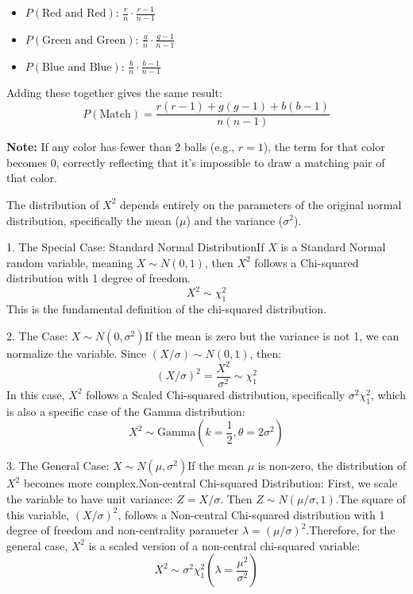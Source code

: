 \documentclass{report}
\begin{document}
\begin{sol}
    \begin{itemize}
        \item $P(\text{Red and Red})$: $\frac{r}{n} \cdot \frac{r-1}{n-1}$
        \item $P(\text{Green and Green})$: $\frac{g}{n} \cdot \frac{g-1}{n-1}$
        \item $P(\text{Blue and Blue})$: $\frac{b}{n} \cdot \frac{b-1}{n-1}$
    \end{itemize}

    Adding these together gives the same result:
    $$P(\text{Match}) = \frac{r(r-1) + g(g-1) + b(b-1)}{n(n-1)}$$

    \textbf{Note:} If any color has fewer than 2 balls (e.g., $r=1$), the term for that color becomes 0, correctly reflecting that it's impossible to draw a matching pair of that color.

\end{sol}


\begin{sol}
    
    The distribution of $X^2$ depends entirely on the parameters of the original normal distribution, specifically the mean ($\mu$) and the variance ($\sigma^2$).
    
    1. The Special Case: Standard Normal DistributionIf $X$ is a Standard Normal random variable, meaning $X \sim N(0, 1)$, then $X^2$ follows a Chi-squared distribution with 1 degree of freedom.$$X^2 \sim \chi^2_1$$This is the fundamental definition of the chi-squared distribution.

    2. The Case: $X \sim N(0, \sigma^2)$If the mean is zero but the variance is not 1, we can normalize the variable. Since $(X/\sigma) \sim N(0, 1)$, then:$$(X/\sigma)^2 = \frac{X^2}{\sigma^2} \sim \chi^2_1$$In this case, $X^2$ follows a Scaled Chi-squared distribution, specifically $\sigma^2 \chi^2_1$, which is also a specific case of the Gamma distribution:$$X^2 \sim \text{Gamma}\left(k=\frac{1}{2}, \theta=2\sigma^2\right)$$

    3. The General Case: $X \sim N(\mu, \sigma^2)$If the mean $\mu$ is non-zero, the distribution of $X^2$ becomes more complex.Non-central Chi-squared Distribution: First, we scale the variable to have unit variance: $Z = X/\sigma$. Then $Z \sim N(\mu/\sigma, 1)$.The square of this variable, $(X/\sigma)^2$, follows a Non-central Chi-squared distribution with 1 degree of freedom and non-centrality parameter $\lambda = (\mu/\sigma)^2$.Therefore, for the general case, $X^2$ is a scaled version of a non-central chi-squared variable:$$X^2 \sim \sigma^2 \chi^2_1\left(\lambda = \frac{\mu^2}{\sigma^2}\right)$$



\end{sol}
\end{document}
